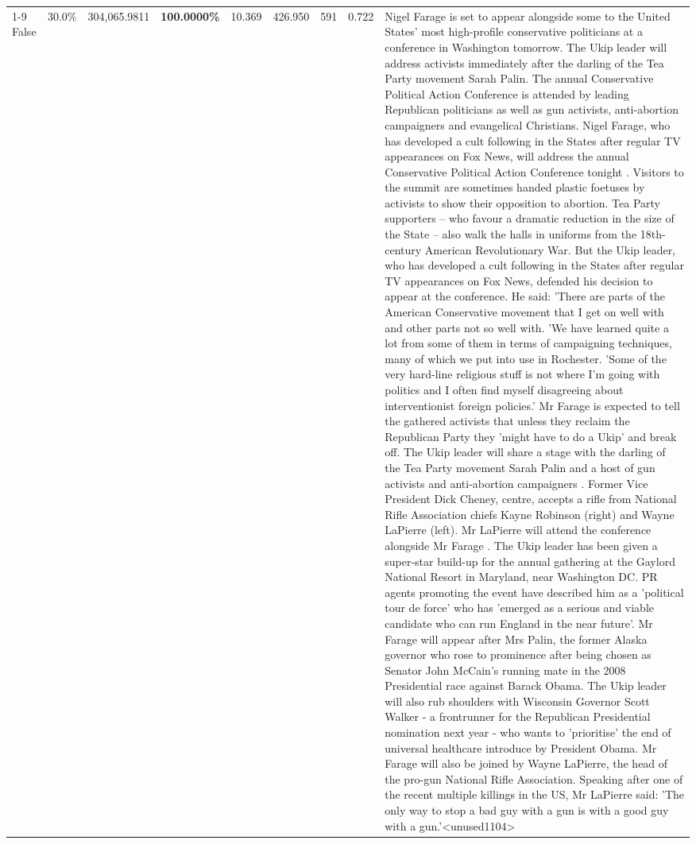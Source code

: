 \begin{table}[H]
\begin{tabular}{lllrlllll}
\cline{1-9}
False & 30.0\% & 304,065.9811 & \bfseries \color{red} 100.0000\% & 10.369 & 426.950 & 591 & 0.722 & Nigel Farage is set to appear alongside some to the United States' most high-profile conservative politicians at a conference in Washington tomorrow. The Ukip leader will address activists immediately after the darling of the Tea Party movement Sarah Palin. The annual Conservative Political Action Conference is attended by leading Republican politicians as well as gun activists, anti-abortion campaigners and evangelical Christians. Nigel Farage, who has developed a cult following in the States after regular TV appearances on Fox News, will address the annual Conservative Political Action Conference tonight . Visitors to the summit are sometimes handed plastic foetuses by activists to show their opposition to abortion. Tea Party supporters – who favour a dramatic reduction in the size of the State – also walk the halls in uniforms from the 18th-century American Revolutionary War. But the Ukip leader, who has developed a cult following in the States after regular TV appearances on Fox News, defended his decision to appear at the conference. He said: 'There are parts of the American Conservative movement that I get on well with and other parts not so well with. 'We have learned quite a lot from some of them in terms of campaigning techniques, many of which we put into use in Rochester. 'Some of the very hard-line religious stuff is not where I'm going with politics and I often find myself disagreeing about interventionist foreign policies.' Mr Farage is expected to tell the gathered activists that unless they reclaim the Republican Party they 'might have to do a Ukip' and break off. The Ukip leader will share a stage with the darling of the Tea Party movement Sarah Palin and a host of gun activists and anti-abortion campaigners . Former Vice President Dick Cheney, centre, accepts a rifle from National Rifle Association chiefs Kayne Robinson (right) and Wayne LaPierre (left). Mr LaPierre will attend the conference alongside Mr Farage . The Ukip leader has been given a super-star build-up for the annual gathering at the Gaylord National Resort in Maryland, near Washington DC. PR agents promoting the event have described him as a 'political tour de force' who has 'emerged as a serious and viable candidate who can run England in the near future'. Mr Farage will appear after Mrs Palin, the former Alaska governor who rose to prominence after being chosen as Senator John McCain's running mate in the 2008 Presidential race against Barack Obama. The Ukip leader will also rub shoulders with Wisconsin Governor Scott Walker - a frontrunner for the Republican Presidential nomination next year - who wants to 'prioritise' the end of universal healthcare introduce by President Obama. Mr Farage will also be joined by Wayne LaPierre, the head of the pro-gun National Rifle Association. Speaking after one of the recent multiple killings in the US, Mr LaPierre said: 'The only way to stop a bad guy with a gun is with a good guy with a gun.'<unused1104> \\

\end{tabular}
\end{table}
